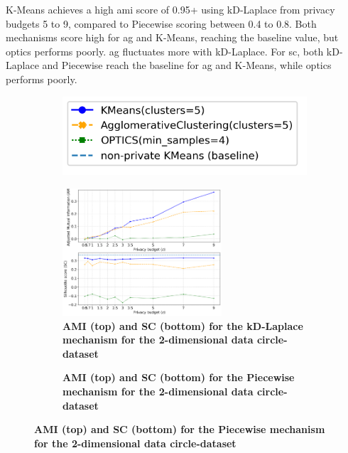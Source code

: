 \begin{figure}[H]
\begin{subfigure}{1\textwidth}
  \end{subfigure}
  \label{fig:validation-heart-dataset_comparison_2d-laplace}
\end{figure}
K-Means achieves a high \gls{ami} score of 0.95+ using kD-Laplace from privacy budgets 5 to 9, compared to Piecewise scoring between 0.4 to 0.8.
Both mechanisms score high for \gls{ag} and K-Means, reaching the baseline value, but \gls{optics} performs poorly.
\gls{ag} fluctuates more with kD-Laplace. For \gls{sc}, both kD-Laplace and Piecewise reach the baseline for \gls{ag} and K-Means, while \gls{optics} performs poorly.
\newpage
\begin{figure}[H]
  \centering
  \begin{subfigure}{0.3\textwidth}
    \includegraphics[width=\textwidth]{Results/kd-laplace/kd-Laplace/circle-dataset/legend_2.png}
  \end{subfigure}
  \begin{subfigure}{1\textwidth}
    \centering
    \caption{\textbf{AMI (top) and SC (bottom) for the kD-Laplace mechanism for the 2-dimensional data circle-dataset}}
    \includegraphics[width=0.65\textwidth]{Results/kd-laplace/kd-Laplace/circle-dataset/ami-and-sc_2_dimensions.png}
    \centering
  \end{subfigure}
  \begin{subfigure}{1\textwidth}
    \centering
    \caption{\textbf{AMI (top) and SC (bottom) for the Piecewise mechanism for the 2-dimensional data circle-dataset}}

\end{subfigure}
\end{figure}
